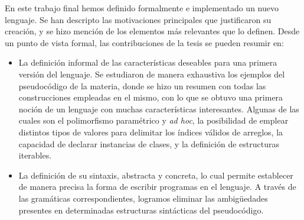 En este trabajo final hemos definido formalmente e implementado un nuevo lenguaje.
Se han descripto las motivaciones principales que justificaron su creación, y se hizo mención de los elementos más relevantes que lo definen.
Desde un punto de vista formal, las contribuciones de la tesis se pueden resumir en:

\begin{itemize}
\item
La definición informal de las características deseables para una primera versión del lenguaje.
Se estudiaron de manera exhaustiva los ejemplos del pseudocódigo de la materia, donde se hizo un resumen con todas las construcciones empleadas en el mismo, con lo que se obtuvo una primera noción de un lenguaje con muchas características interesantes.
Algunas de las cuales son el polimorfismo paramétrico y \textit{ad hoc}, la posibilidad de emplear distintos tipos de valores para delimitar los índices válidos de arreglos, la capacidad de declarar instancias de clases, y la definición de estructuras iterables.
\item
La definición de su sintaxis, abstracta y concreta, lo cual permite establecer de manera precisa la forma de escribir programas en el lenguaje.
A través de las gramáticas correspondientes, logramos eliminar las ambigüedades presentes en determinadas estructuras sintácticas del pseudocódigo.

\end{itemize}

